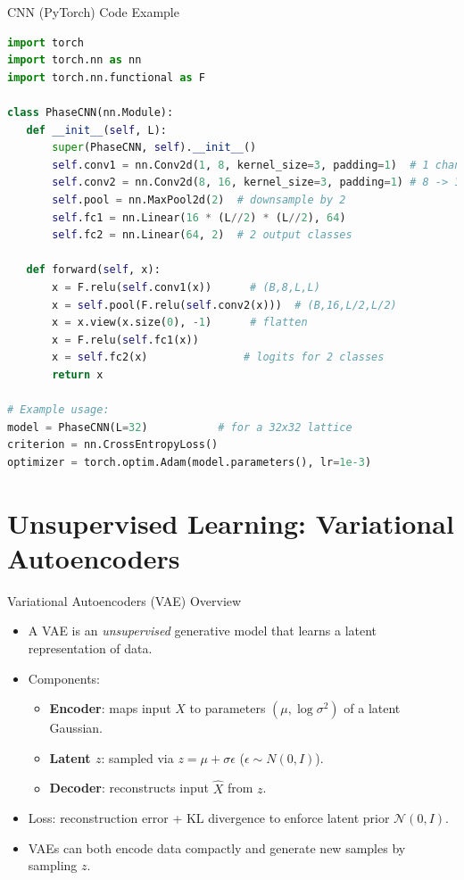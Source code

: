 \documentclass{beamer}
\begin{document}
\begin{frame}[fragile]{CNN (PyTorch) Code Example}
 \begin{lstlisting}[language=Python]
import torch
import torch.nn as nn
import torch.nn.functional as F

class PhaseCNN(nn.Module):
   def __init__(self, L):
       super(PhaseCNN, self).__init__()
       self.conv1 = nn.Conv2d(1, 8, kernel_size=3, padding=1)  # 1 channel -> 8
       self.conv2 = nn.Conv2d(8, 16, kernel_size=3, padding=1) # 8 -> 16
       self.pool = nn.MaxPool2d(2)  # downsample by 2
       self.fc1 = nn.Linear(16 * (L//2) * (L//2), 64)
       self.fc2 = nn.Linear(64, 2)  # 2 output classes

   def forward(self, x):
       x = F.relu(self.conv1(x))      # (B,8,L,L)
       x = self.pool(F.relu(self.conv2(x)))  # (B,16,L/2,L/2)
       x = x.view(x.size(0), -1)      # flatten
       x = F.relu(self.fc1(x))
       x = self.fc2(x)               # logits for 2 classes
       return x

# Example usage:
model = PhaseCNN(L=32)           # for a 32x32 lattice
criterion = nn.CrossEntropyLoss()
optimizer = torch.optim.Adam(model.parameters(), lr=1e-3)
 \end{lstlisting}
\end{frame}

\section{Unsupervised Learning: Variational Autoencoders}

\begin{frame}{Variational Autoencoders (VAE) Overview}
 \begin{itemize}
   \item A VAE is an \emph{unsupervised} generative model that learns a latent representation of data.
   \item Components:
     \begin{itemize}
       \item \textbf{Encoder}: maps input $X$ to parameters $(\mu, \log\sigma^2)$ of a latent Gaussian.
       \item \textbf{Latent $z$}: sampled via $z = \mu + \sigma \epsilon$ ($\epsilon\sim N(0,I)$).
       \item \textbf{Decoder}: reconstructs input $\hat{X}$ from $z$.
     \end{itemize}
   \item Loss: reconstruction error + KL divergence to enforce latent prior $\mathcal{N}(0,I)$.
   \item VAEs can both encode data compactly and generate new samples by sampling $z$.
 \end{itemize}
\end{frame}
\end{document}
